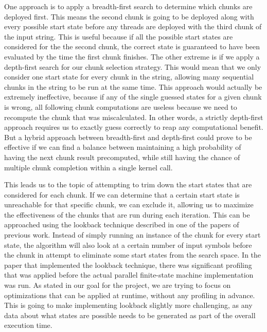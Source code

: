 \documentclass[11pt]{sigplanconf}
\begin{document}
One approach is to apply a breadth-first search to determine which chunks are deployed first. This means the second chunk is going to be deployed along with every possible start state before any threads are deployed with the third chunk of the input string. This is useful because if all the possible start states are considered for the the second chunk, the correct state is guaranteed to have been evaluated by the time the first chunk finishes. The other extreme is if we apply a depth-first search for our chunk selection strategy. This would mean that we only consider one start state for every chunk in the string, allowing many sequential chunks in the string to be run at the same time. This approach would actually be extremely ineffective, because if any of the single guessed states for a given chunk is wrong, all following chunk computations are useless because we need to recompute the chunk that was miscalculated. In other words, a strictly depth-first approach requires us to exactly guess correctly to reap any computational benefit. But a hybrid approach between breadth-first and depth-first could prove to be effective if we can find a balance between maintaining a high probability of having the next chunk result precomputed, while still having the chance of multiple chunk completion within a single kernel call.

This leads us to the topic of attempting to trim down the start states that are considered for each chunk. If we can determine that a certain start state is unreachable for that specific chunk, we can exclude it, allowing us to maximize the effectiveness of the chunks that are run during each iteration. This can be approached using the lookback technique described in one of the papers of previous work. Instead of simply running an instance of the chunk for every start state, the algorithm will also look at a certain number of input symbols before the chunk in attempt to eliminate some start states from the search space. In the paper that implemented the lookback technique, there was significant profiling that was applied before the actual parallel finite-state machine implementation was run. As stated in our goal for the project, we are trying to focus on optimizations that can be applied at runtime, without any profiling in advance. This is going to make implementing lookback slightly more challenging, as any data about what states are possible needs to be generated as part of the overall execution time.
\end{document}
